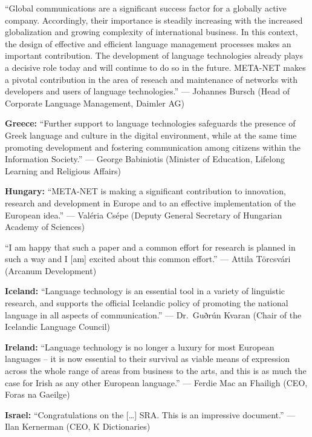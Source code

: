 \documentclass[10pt, plain]{../../metanetpaper}
\begin{document}

\medskip ``Global communications are a significant success factor for a globally active company. Accordingly, their importance is steadily increasing with the increased globalization and growing complexity of international business. In this context, the design of effective and efficient language management processes makes an important contribution. The development of language technologies already plays a decisive role today and will continue to do so in the future. META-NET makes a pivotal contribution in the area of reseach and maintenance of networks with developers and users of language technologies.'' ---
Johannes Bursch (Head of Corporate Language Management, Daimler AG)

\medskip \textbf{Greece:} ``Further support to language technologies safeguards the presence of Greek language and culture in the digital environment, while at the same time promoting development and fostering communication among citizens within the Information Society.'' --- George Babiniotis (Minister of Education, Lifelong Learning and Religious Affairs)

\medskip \textbf{Hungary:} ``META-NET is making a significant contribution to innovation, research and development in Europe and to an effective implementation of the European idea.'' --- Valéria Csépe (Deputy General Secretary of Hungarian Academy of Sciences)

\medskip ``I am happy that such a paper and a common effort for research is planned in such a way and I [am] excited about this common effort.'' --- Attila Törcsvári (Arcanum Development)

\medskip \textbf{Iceland:} ``Language technology is an essential tool in a variety of linguistic research, and supports the official Icelandic policy of promoting the national language in all aspects of communication.'' --- Dr.~Guðrún Kvaran (Chair of the Icelandic Language Council)

\medskip \textbf{Ireland:} ``Language technology is no longer a luxury for most European languages -- it is now essential to their survival as viable means of expression across the whole range of areas from business to the arts, and this is as much the case for Irish as any other European language.'' --- Ferdie Mac an Fhailigh (CEO, Foras na Gaeilge)

\medskip \textbf{Israel:} ``Congratulations on the [\dots] SRA. This is an impressive document.'' --- Ilan Kernerman (CEO, K Dictionaries)
\end{document}
